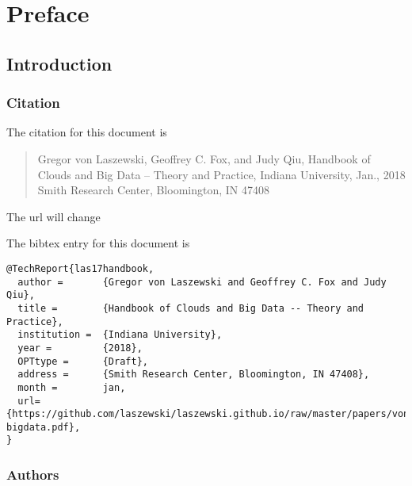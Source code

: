 
\part{Preface}





\chapter{Introduction}

\section{Citation}

The citation for this document is 

\begin{quote}

Gregor von Laszewski, Geoffrey C. Fox, and Judy Qiu, Handbook of
Clouds and Big Data -- Theory and Practice, Indiana University,
Jan., 2018
Smith Research Center, Bloomington, IN 47408
\end{quote}

\begin{WARNING}
The url will change
\end{WARNING}

The bibtex entry for this document is

\begin{verbatim}
@TechReport{las17handbook,
  author =       {Gregor von Laszewski and Geoffrey C. Fox and Judy Qiu},
  title =        {Handbook of Clouds and Big Data -- Theory and Practice},
  institution =  {Indiana University},
  year =         {2018},
  OPTtype =      {Draft},
  address =      {Smith Research Center, Bloomington, IN 47408},
  month =        jan,
  url={https://github.com/laszewski/laszewski.github.io/raw/master/papers/vonLaszewski-bigdata.pdf},
}
\end{verbatim}



\section{Authors}

